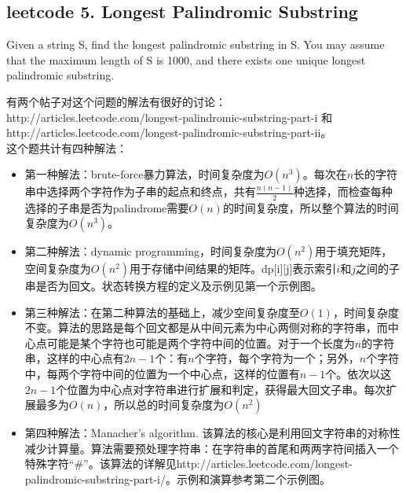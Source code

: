 \documentclass[a4paper,10pt]{article}
\begin{document}
\subsection{leetcode 5. Longest Palindromic Substring}
Given a string S, find the longest palindromic substring in S. You may assume that the maximum length of S is 1000, and there exists one unique longest palindromic substring. \\

\begin{CJK*}{UTF8}{gbsn}
\noindent 有两个帖子对这个问题的解法有很好的讨论：http://articles.leetcode.com/longest-palindromic-substring-part-i 和 http://articles.leetcode.com/longest-palindromic-substring-part-ii。\\

\noindent 这个题共计有四种解法：
\begin{itemize}
    \item 第一种解法：brute-force暴力算法，时间复杂度为$O(n^3)$。每次在$n$长的字符串中选择两个字符作为子串的起点和终点，共有$\frac{n(n-1)}{2}$种选择，而检查每种选择的子串是否为palindrome需要$O(n)$的时间复杂度，所以整个算法的时间复杂度为$O(n^3)$。
    
    \item 第二种解法：dynamic programming，时间复杂度为$O(n^2)$用于填充矩阵，空间复杂度为$O(n^2)$用于存储中间结果的矩阵。dp[i][j]表示索引$i$和$j$之间的子串是否为回文。状态转换方程的定义及示例见第一个示例图。
    
    \item 第三种解法：在第二种算法的基础上，减少空间复杂度至$O(1)$，时间复杂度不变。算法的思路是每个回文都是从中间元素为中心两侧对称的字符串，而中心点可能是某个字符也可能是两个字符中间的位置。对于一个长度为$n$的字符串，这样的中心点有$2n-1$个：有$n$个字符，每个字符为一个；另外，$n$个字符中，每两个字符中间的位置为一个中心点，这样的位置有$n-1$个。依次以这$2n-1$个位置为中心点对字符串进行扩展和判定，获得最大回文子串。每次扩展最多为$O(n)$，所以总的时间复杂度为$O(n^2)$
    
    \item 第四种解法：Manacher's algorithm. 该算法的核心是利用回文字符串的对称性减少计算量。算法需要预处理字符串：在字符串的首尾和两两字符间插入一个特殊字符“#”。该算法的详解见http://articles.leetcode.com/longest-palindromic-substring-part-i/。示例和演算参考第二个示例图。
\end{itemize}
\end{CJK*}\\
\end{document}
